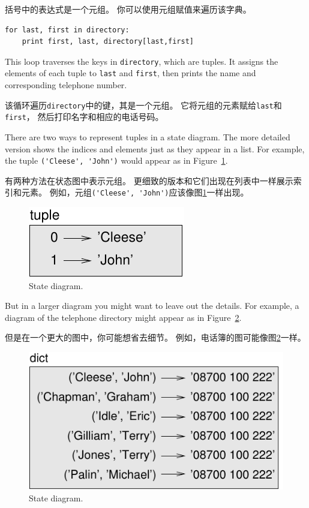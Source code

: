 \documentclass[10pt]{book}
\begin{document}
\begin{CJK}{UTF8}{gbsn}
括号中的表达式是一个元组。
你可以使用元组赋值来遍历该字典。

\begin{verbatim}
for last, first in directory:
    print first, last, directory[last,first]
\end{verbatim}
%
This loop traverses the keys in {\tt directory}, which are tuples.  It
assigns the elements of each tuple to {\tt last} and {\tt first}, then
prints the name and corresponding telephone number.

该循环遍历{\tt directory}中的键，其是一个元组。
它将元组的元素赋给{\tt last}和{\tt first}，
然后打印名字和相应的电话号码。

There are two ways to represent tuples in a state diagram.  The more
detailed version shows the indices and elements just as they appear in
a list.  For example, the tuple \verb"('Cleese', 'John')" would appear
as in Figure~\ref{fig.tuple1}.

有两种方法在状态图中表示元组。
更细致的版本和它们出现在列表中一样展示索引和元素。
例如，元组\verb"('Cleese', 'John')"应该像图\ref{fig.tuple1}一样出现。

\begin{figure}
\centerline
{\includegraphics[scale=0.8]{figs/tuple1.pdf}}
\caption{State diagram.}
\label{fig.tuple1}
\end{figure}

But in a larger diagram you might want to leave out the
details.  For example, a diagram of the telephone directory might
appear as in Figure~\ref{fig.dict2}.

但是在一个更大的图中，你可能想省去细节。
例如，电话簿的图可能像图\ref{fig.dict2}一样。

\begin{figure}
\centerline
{\includegraphics[scale=0.8]{figs/dict2.pdf}}
\caption{State diagram.}
\label{fig.dict2}
\end{figure}


\end{CJK}
\end{document}
